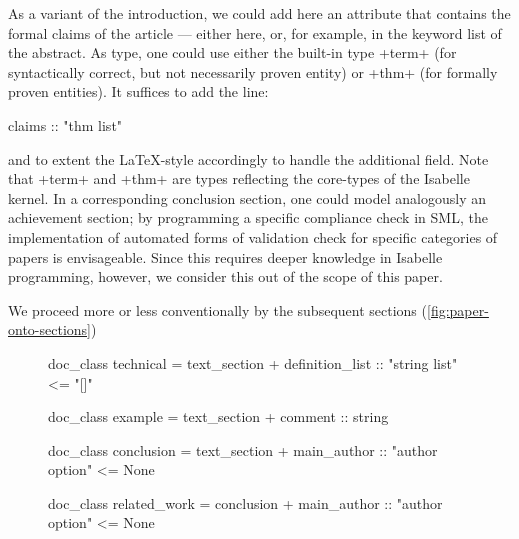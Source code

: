 \begin{isabellebody}
\begin{isamarkuptext}
As a variant of the introduction, we could add here an attribute that contains the formal 
claims of the article --- either here, or, for example, in the keyword list of the abstract. 
As type, one could use either the built-in type \inlineisar+term+ (for syntactically correct, 
but not necessarily proven entity) or \inlineisar+thm+ (for formally proven entities). It suffices 
to add the line:
\begin{isar}
   claims  :: "thm list"
\end{isar}
and to extent the \LaTeX-style accordingly to handle the additional field. 
Note that \inlineisar+term+ and \inlineisar+thm+ are types reflecting the core-types of the
Isabelle kernel. In a corresponding conclusion section, one could model analogously an 
achievement section; by programming a specific compliance check in SML, the implementation 
of automated forms of validation check for specific categories of papers is envisageable. 
Since this requires deeper knowledge in Isabelle programming, however, we consider this out 
of the scope of this paper.


We proceed more or less conventionally by the subsequent sections (\autoref{fig:paper-onto-sections})
\begin{figure}
\begin{isar}
doc_class technical = text_section +
   definition_list :: "string list" <=  "[]"

doc_class example   = text_section +
   comment :: string

doc_class conclusion = text_section +
   main_author :: "author option"  <=  None
   
doc_class related_work = conclusion +
   main_author :: "author option"  <=  None


\end{isar}
\end{figure}
\end{isamarkuptext}
\end{isabellebody}
